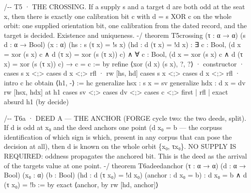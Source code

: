 \documentclass[10pt]{article}
\renewcommand{\_}{\origunderscore\allowbreak}
\newenvironment{Shaded}{}{}
\newcommand{\NormalTok}[1]{#1}
\begin{document}
\begin{Shaded}
\begin{Highlighting}[]
\NormalTok{/{-}{-} T5 · THE CROSSING.}
\NormalTok{    If a supply s and a target d are both odd at the seat x, then there is}
\NormalTok{    exactly one calibration bit c with d = s XOR c on the whole orbit:}
\NormalTok{    one supplied orientation bit, one calibration from the dated record,}
\NormalTok{    and the target is decided. Existence and uniqueness. {-}/}
\NormalTok{theorem T5\_crossing (τ : α → α) (s d : α → Bool) (x : α)}
\NormalTok{    (hs : s (τ x) = !s x) (hd : d (τ x) = !d x) :}
\NormalTok{    ∃ c : Bool, (d x = xor (s x) c ∧ d (τ x) = xor (s (τ x)) c) ∧}
\NormalTok{      ∀ c\textquotesingle{} : Bool, (d x = xor (s x) c\textquotesingle{} ∧ d (τ x) = xor (s (τ x)) c\textquotesingle{}) → c\textquotesingle{} = c := by}
\NormalTok{  refine ⟨xor (d x) (s x), ?\_, ?\_⟩}
\NormalTok{  · constructor}
\NormalTok{    · cases s x \textless{};\textgreater{} cases d x \textless{};\textgreater{} rfl}
\NormalTok{    · rw [hs, hd]}
\NormalTok{      cases s x \textless{};\textgreater{} cases d x \textless{};\textgreater{} rfl}
\NormalTok{  · intro c\textquotesingle{} hc}
\NormalTok{    obtain ⟨h1, {-}⟩ := hc}
\NormalTok{    generalize hsx : s x = sv}
\NormalTok{    generalize hdx : d x = dv}
\NormalTok{    rw [hsx, hdx] at h1}
\NormalTok{    cases sv \textless{};\textgreater{} cases dv \textless{};\textgreater{} cases c\textquotesingle{} \textless{};\textgreater{} first | rfl | exact absurd h1 (by decide)}

\NormalTok{/{-}{-} T6a · DEED A — THE ANCHOR (FORGE cycle two: the two deeds, split).}
\NormalTok{    If d is odd at x₀ and the deed anchors one point (d x₀ = b — the}
\NormalTok{    corpus\textquotesingle{}s identification of which sign is which, present in any corpus}
\NormalTok{    that can pose the decision at all), then d is known on the whole orbit}
\NormalTok{    \{x₀, τx₀\}. NO SUPPLY IS REQUIRED: oddness propagates the anchored bit.}
\NormalTok{    This is the deed as the arrival of the target\textquotesingle{}s value at one point. {-}/}
\NormalTok{theorem T6a\_deed\_anchor (τ : α → α) (d : α → Bool) (x₀ : α) (b : Bool)}
\NormalTok{    (hd : d (τ x₀) = !d x₀) (anchor : d x₀ = b) :}
\NormalTok{    d x₀ = b ∧ d (τ x₀) = !b := by}
\NormalTok{  exact ⟨anchor, by rw [hd, anchor]⟩}


\end{Highlighting}
\end{Shaded}
\end{document}
